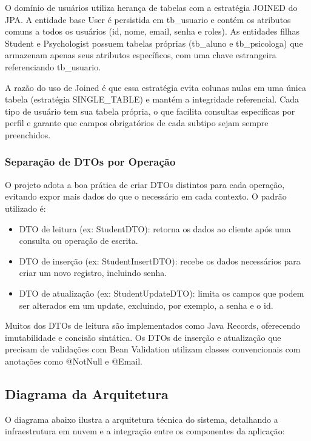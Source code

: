 O domínio de usuários utiliza herança de tabelas com a estratégia JOINED do JPA. A entidade base User é persistida em tb\_usuario e contém os atributos comuns a todos os usuários (id, nome, email, senha e roles). As entidades filhas Student e Psychologist possuem tabelas próprias (tb\_aluno e tb\_psicologa) que armazenam apenas seus atributos específicos, com uma chave estrangeira referenciando tb\_usuario.

A razão do uso de Joined é que essa estratégia evita colunas nulas em uma única tabela (estratégia SINGLE\_TABLE) e mantém a integridade referencial. Cada tipo de usuário tem sua tabela própria, o que facilita consultas específicas por perfil e garante que campos obrigatórios de cada subtipo sejam sempre preenchidos.

\subsubsection{Separação de DTOs por Operação}

O projeto adota a boa prática de criar DTOs distintos para cada operação, evitando expor mais dados do que o necessário em cada contexto. O padrão utilizado é:
\begin{itemize}
    \item DTO de leitura (ex: StudentDTO): retorna os dados ao cliente após uma consulta ou operação de escrita.
    \item DTO de inserção (ex: StudentInsertDTO): recebe os dados necessários para criar um novo registro, incluindo senha.
    \item DTO de atualização (ex: StudentUpdateDTO): limita os campos que podem ser alterados em um update, excluindo, por exemplo, a senha e o id.
\end{itemize}

Muitos dos DTOs de leitura são implementados como Java Records, oferecendo imutabilidade e concisão sintática. Os DTOs de inserção e atualização que precisam de validações com Bean Validation utilizam classes convencionais com anotações como @NotNull e @Email.

\subsection{Diagrama da Arquitetura}

O diagrama abaixo ilustra a arquitetura técnica do sistema, detalhando a infraestrutura em nuvem e a integração entre os componentes da aplicação:

